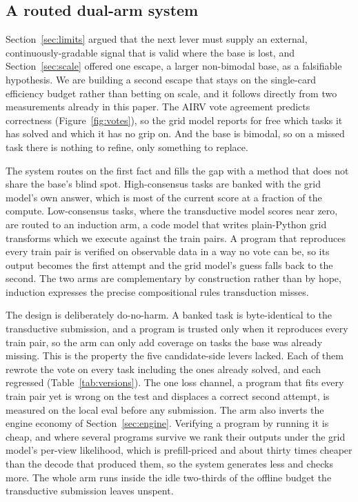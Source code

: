 \documentclass[11pt]{article}
\begin{document}
\subsection{A routed dual-arm system}
\label{sec:dualarm}
Section~\ref{sec:limits} argued that the next lever must supply an external, continuously-gradable signal
that is valid where the base is lost, and Section~\ref{sec:scale} offered one escape, a larger
non-bimodal base, as a falsifiable hypothesis. We are building a second escape that stays on the
single-card efficiency budget rather than betting on scale, and it follows directly from two measurements
already in this paper. The AIRV vote agreement predicts correctness (Figure~\ref{fig:votes}), so the grid
model reports for free which tasks it has solved and which it has no grip on. And the base is bimodal, so
on a missed task there is nothing to refine, only something to replace.

The system routes on the first fact and fills the gap with a method that does not share the base's blind
spot. High-consensus tasks are banked with the grid model's own answer, which is most of the current
score at a fraction of the compute. Low-consensus tasks, where the transductive model scores near zero,
are routed to an induction arm, a code model that writes plain-Python grid transforms which we execute
against the train pairs. A program that reproduces every train pair is verified on observable data in a
way no vote can be, so its output becomes the first attempt and the grid model's guess falls back to the
second. The two arms are complementary by construction rather than by hope, induction expresses the
precise compositional rules transduction misses.

The design is deliberately do-no-harm. A banked task is byte-identical to the transductive submission,
and a program is trusted only when it reproduces every train pair, so the arm can only add coverage on
tasks the base was already missing. This is the property the five candidate-side levers lacked. Each of
them rewrote the vote on every task including the ones already solved, and each regressed
(Table~\ref{tab:versions}). The one loss channel, a program that fits every train pair yet is wrong on
the test and displaces a correct second attempt, is measured on the local eval before any submission. The
arm also inverts the engine economy of Section~\ref{sec:engine}. Verifying a program by running it is
cheap, and where several programs survive we rank their outputs under the grid model's per-view
likelihood, which is prefill-priced and about thirty times cheaper than the decode that produced them, so
the system generates less and checks more. The whole arm runs inside the idle two-thirds of the offline
budget the transductive submission leaves unspent.
\end{document}
